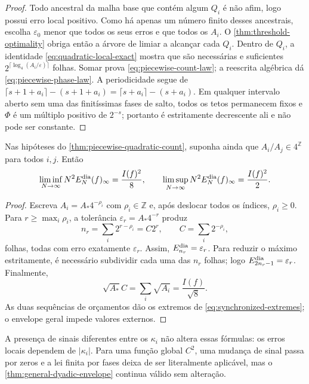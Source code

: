 \begin{proof}
Todo ancestral da malha base que contém algum $Q_i$ é não afim, logo possui
erro local positivo. Como há apenas um número finito desses ancestrais,
escolha $\varepsilon_0$ menor que todos os seus erros e que todos os $A_i$.
O \cref{thm:threshold-optimality} obriga então a árvore de limiar a alcançar
cada $Q_i$. Dentro de $Q_i$, a identidade
\eqref{eq:quadratic-local-exact} mostra que são necessárias e suficientes
$2^{\lceil\log_4(A_i/\varepsilon)\rceil}$ folhas. Somar prova
\eqref{eq:piecewise-count-law}; a reescrita algébrica dá
\eqref{eq:piecewise-phase-law}. A periodicidade segue de
$\lceil s+1+a_i\rceil-(s+1+a_i)=\lceil s+a_i\rceil-(s+a_i)$.
Em qualquer intervalo aberto sem uma das finitíssimas fases de salto, todos
os tetos permanecem fixos e $\Phi$ é um múltiplo positivo de $2^{-s}$;
portanto é estritamente decrescente ali e não pode ser constante.
\end{proof}

\begin{corollary}
\label{cor:synchronized-phases}
Nas hipóteses do \cref{thm:piecewise-quadratic-count}, suponha ainda que
$A_i/A_j\in4^{\mathbb Z}$ para todos $i,j$. Então
\begin{equation}
 \liminf_{N\to\infty}N^2E_N^{\rm dia}(f)_\infty=\frac{I(f)^2}{8},
 \qquad
 \limsup_{N\to\infty}N^2E_N^{\rm dia}(f)_\infty=\frac{I(f)^2}{2}.
 \label{eq:synchronized-extremes}
\end{equation}
\end{corollary}

\begin{proof}
Escreva $A_i=A_\ast4^{-\rho_i}$ com $\rho_i\in\mathbb Z$ e, após deslocar
todos os índices, $\rho_i\ge0$. Para $r\ge\max_i\rho_i$, a tolerância
$\varepsilon_r=A_\ast4^{-r}$ produz
\[
 n_r=\sum_i2^{r-\rho_i}=C2^r,
 \qquad C=\sum_i2^{-\rho_i},
\]
folhas, todas com erro exatamente $\varepsilon_r$. Assim,
$E_{n_r}^{\rm dia}=\varepsilon_r$. Para reduzir o máximo estritamente, é
necessário subdividir cada uma das $n_r$ folhas; logo
$E_{2n_r-1}^{\rm dia}=\varepsilon_r$. Finalmente,
\[
 \sqrt{A_\ast}C=\sum_i\sqrt{A_i}=\frac{I(f)}{\sqrt8}.
\]
As duas sequências de orçamentos dão os extremos de
\eqref{eq:synchronized-extremes}; o envelope geral impede valores externos.
\end{proof}

A presença de sinais diferentes entre os $\kappa_i$ não altera essas
fórmulas: os erros locais dependem de $|\kappa_i|$. Para uma função global
$C^2$, uma mudança de sinal passa por zeros e a lei finita por fases deixa de
ser literalmente aplicável, mas o \cref{thm:general-dyadic-envelope} continua
válido sem alteração.

